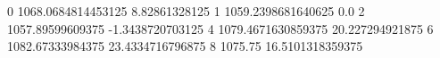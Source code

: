0 1068.0684814453125 8.82861328125
1 1059.2398681640625 0.0
2 1057.89599609375 -1.3438720703125
4 1079.4671630859375 20.227294921875
6 1082.67333984375 23.4334716796875
8 1075.75 16.5101318359375
